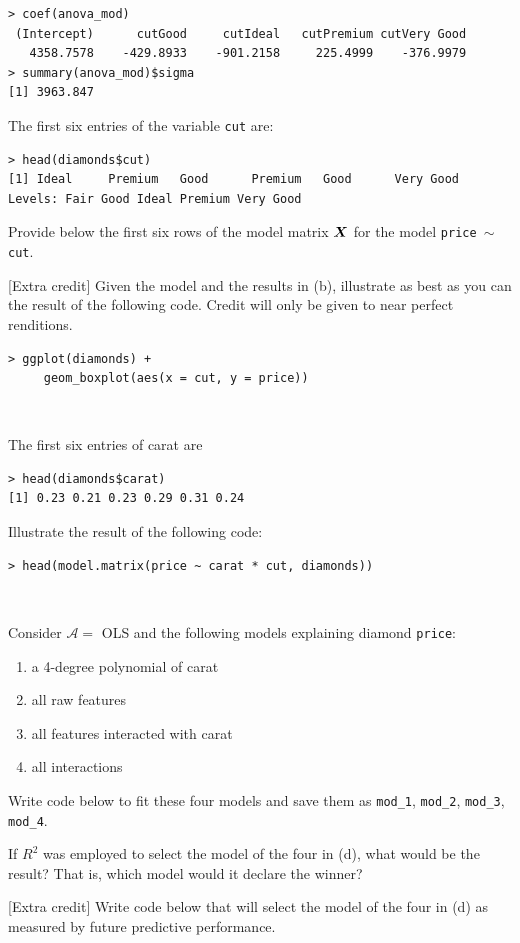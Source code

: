 \documentclass[12pt]{article}
\begin{document}
\begin{lstlisting}
> coef(anova_mod)
 (Intercept)      cutGood     cutIdeal   cutPremium cutVery Good 
   4358.7578    -429.8933    -901.2158     225.4999    -376.9979 
> summary(anova_mod)$sigma
[1] 3963.847
\end{lstlisting}
\vspace{-0.8cm}

The first six entries of the variable \texttt{cut} are:

\begin{lstlisting}
> head(diamonds$cut)
[1] Ideal     Premium   Good      Premium   Good      Very Good
Levels: Fair Good Ideal Premium Very Good
\end{lstlisting}
\vspace{-0.8cm}

Provide below the first six rows of the model matrix $\boldsymbol{X}$ for the model \texttt{price $\sim$ cut}.

 [Extra credit] Given the model and the results in (b), illustrate as best as you can the result of the following code. Credit will only be given to near perfect renditions.

\begin{lstlisting}
> ggplot(diamonds) + 
     geom_boxplot(aes(x = cut, y = price))
\end{lstlisting}~

 The first six entries of carat are 

\begin{lstlisting}
> head(diamonds$carat)
[1] 0.23 0.21 0.23 0.29 0.31 0.24
\end{lstlisting}
\vspace{-0.8cm}

Illustrate the result of the following code:

\begin{lstlisting}
> head(model.matrix(price ~ carat * cut, diamonds))
\end{lstlisting}~


 Consider $\mathcal{A} = $ OLS and the following models explaining diamond \texttt{price}:


\begin{enumerate}[1.]
\item a 4-degree polynomial of carat
\item all raw features
\item all features interacted with carat
\item all interactions
\end{enumerate}

Write code below to fit these four models and save them as \texttt{mod\_1}, \texttt{mod\_2}, \texttt{mod\_3}, \texttt{mod\_4}. 

 If $R^2$ was employed to select the  model of the four in (d), what would be the result? That is, which model would it declare the winner?

 [Extra credit] Write code below that will select the  model of the four in (d) as measured by future predictive performance.

\eenum
\end{document}
